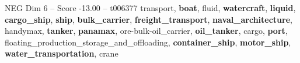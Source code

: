 \begin{textsample}{NEG Dim 6 – Score -13.00 – t006377}  \label{ex:f6_neg_002}
transport, \textbf{boat}, fluid, \textbf{watercraft}, \textbf{liquid}, \textbf{cargo\_ship}, \textbf{ship}, \textbf{bulk\_carrier}, \textbf{freight\_transport}, \textbf{naval\_architecture}, handymax, \textbf{tanker}, \textbf{panamax}, ore-bulk-oil\_carrier, \textbf{oil\_tanker}, cargo, \textbf{port}, floating\_production\_storage\_and\_offloading, \textbf{container\_ship}, \textbf{motor\_ship}, \textbf{water\_transportation}, crane

\end{textsample}
